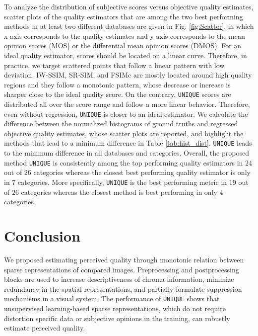 \documentclass[draftcls,12pt, onecolumn]{IEEEtran}
\begin{document}
\vspace{-2.0mm}


To analyze the distribution of subjective scores versus objective quality estimates, scatter plots of the quality estimators that are among the two best performing methods in at least two different databases are given in Fig. \ref{fig:Scatter}, in which x axis corresponds to the quality estimates and y axis corresponds to the mean opinion scores (MOS) or the differential mean opinion scores (DMOS). For an ideal quality estimator, scores should be located on a linear curve. Therefore, in practice, we target scattered points that follow a linear pattern with low deviation. IW-SSIM, SR-SIM, and FSIMc are mostly located around high quality regions and they follow a monotonic pattern, whose decrease or increase is sharper close to the ideal quality score. On the contrary, \texttt{UNIQUE} scores are distributed all over the score range and follow a more linear behavior. Therefore, even without regression, \texttt{UNIQUE} is closer to an ideal estimator. We calculate the difference between the normalized histograms of ground truths and regressed objective quality estimates, whose scatter plots are reported, and highlight the methods that lead to a minimum difference in Table \ref{tab:hist_dist}. \texttt{UNIQUE} leads to the minimum difference in all databases and categories. Overall, the proposed method \texttt{UNIQUE} is consistently among the top performing quality estimators in $24$ out of $26$ categories whereas the closest best performing quality estimator is only in $7$ categories. More specifically, \texttt{UNIQUE} is the best performing metric in $19$ out of $26$ categories whereas the closest method is best performing in only $4$ categories.


 

\vspace{-2.0mm}


\section{Conclusion}
We proposed estimating perceived quality through monotonic relation between sparse representations of compared images. Preprocessing and postprocessing blocks are used to increase descriptiveness of chroma information, minimize redundancy in the spatial representations, and partially formulate suppression mechanisms in a visual system. The performance of \texttt{UNIQUE} shows that unsupervised learning-based sparse representations, which do not require distortion specific data or subjective opinions in the training, can robustly estimate perceived quality.  
\end{document}
